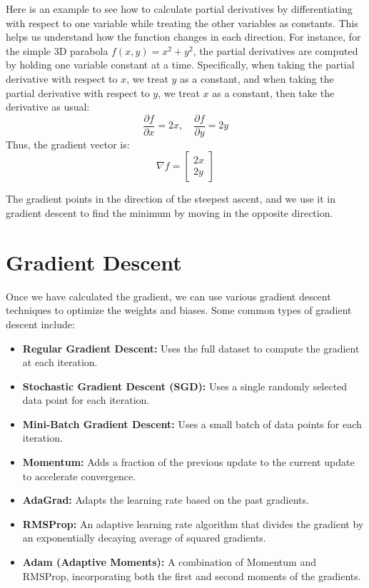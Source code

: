 Here is an example to see how to calculate partial derivatives by differentiating with respect to one variable while treating the other variables as constants. 
This helps us understand how the function changes in each direction. For instance, for the simple 3D parabola \( f(x, y) = x^2 + y^2 \), the partial derivatives are computed by holding one variable constant at a time. Specifically, when taking the partial derivative with respect to \( x \), we treat \( y \) as a constant, and when taking the partial derivative with respect to \( y \), we treat \( x \) as a constant, then take the derivative as usual:
\[
\frac{\partial f}{\partial x} = 2x, \quad \frac{\partial f}{\partial y} = 2y
\]
Thus, the gradient vector is:
\[
\nabla f = \begin{bmatrix} 2x \\ 2y \end{bmatrix}
\]

The gradient points in the direction of the steepest ascent, and we use it in gradient descent to find the minimum by moving in the opposite direction.

\section{Gradient Descent}

Once we have calculated the gradient, we can use various gradient descent \cite{goodfellow2016deep} techniques to optimize the weights and biases. Some common types of gradient descent include:

\begin{itemize}
    \item \textbf{Regular Gradient Descent:} Uses the full dataset to compute the gradient at each iteration.
    \item \textbf{Stochastic Gradient Descent (SGD):} Uses a single randomly selected data point for each iteration.
    \item \textbf{Mini-Batch Gradient Descent:} Uses a small batch of data points for each iteration.
    \item \textbf{Momentum:} Adds a fraction of the previous update to the current update to accelerate convergence.
    \item \textbf{AdaGrad:} Adapts the learning rate based on the past gradients.
    \item \textbf{RMSProp:} An adaptive learning rate algorithm that divides the gradient by an exponentially decaying average of squared gradients.
    \item \textbf{Adam (Adaptive Moments):} A combination of Momentum and RMSProp, incorporating both the first and second moments of the gradients.
\end{itemize}

